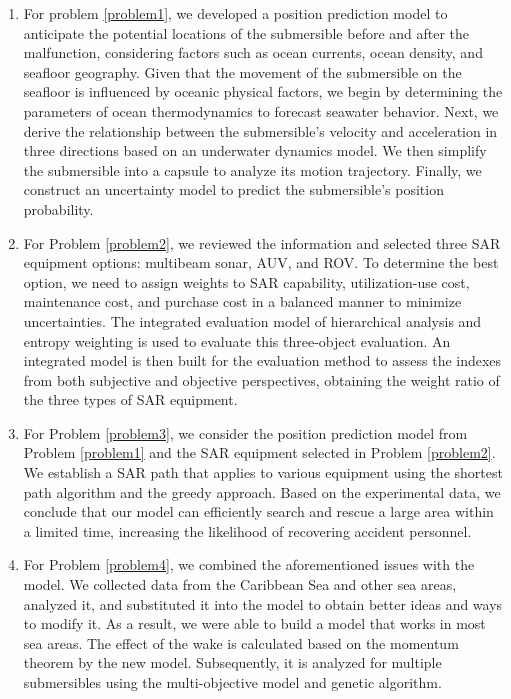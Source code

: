 \documentclass[12pt]{article}
\begin{document}
\begin{enumerate}
    \item For problem \ref{problem1}, we developed a position prediction model to anticipate the potential locations of the submersible before and after the malfunction, considering factors such as ocean currents, ocean density, and seafloor geography. Given that the movement of the submersible on the seafloor is influenced by oceanic physical factors, we begin by determining the parameters of ocean thermodynamics to forecast seawater behavior. Next, we derive the relationship between the submersible's velocity and acceleration in three directions based on an underwater dynamics model. We then simplify the submersible into a capsule to analyze its motion trajectory. Finally, we construct an uncertainty model to predict the submersible's position probability.
    \item For Problem \ref{problem2}, we reviewed the information and selected three SAR equipment options: multibeam sonar, AUV, and ROV. To determine the best option, we need to assign weights to SAR capability, utilization-use cost, maintenance cost, and purchase cost in a balanced manner to minimize uncertainties. The integrated evaluation model of hierarchical analysis and entropy weighting is used to evaluate this three-object evaluation. An integrated model is then built for the evaluation method to assess the indexes from both subjective and objective perspectives, obtaining the weight ratio of the three types of SAR equipment.
    \item For Problem \ref{problem3}, we consider the position prediction model from Problem \ref{problem1} and the SAR equipment selected in Problem \ref{problem2}. We establish a SAR path that applies to various equipment using the shortest path algorithm and the greedy approach. Based on the experimental data, we conclude that our model can efficiently search and rescue a large area within a limited time, increasing the likelihood of recovering accident personnel.
    \item For Problem \ref{problem4}, we combined the aforementioned issues with the model. We collected data from the Caribbean Sea and other sea areas, analyzed it, and substituted it into the model to obtain better ideas and ways to modify it. As a result, we were able to build a model that works in most sea areas. The effect of the wake is calculated based on the momentum theorem by the new model. Subsequently, it is analyzed for multiple submersibles using the multi-objective model and genetic algorithm.
\end{enumerate}
\end{document}
